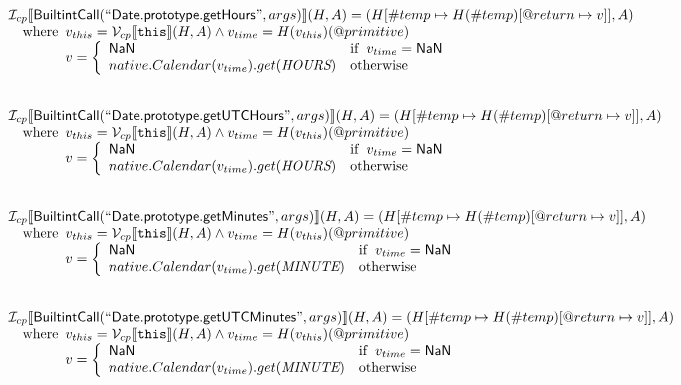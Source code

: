 \[\begin{array}{l}
\mathcal{I} _{cp}\llbracket \mbox{\textsf{BuiltintCall}}(``\mbox{\textsf{Date.prototype.getHours}}",args)\rrbracket(H,A)
  = (H[\#temp \mapsto H(\#temp)[@return \mapsto v]], A)\\
\quad{\rm where}\begin{array}[t]{l}
  v_{this} = \mathcal{V} _{cp}\llbracket \mbox{\texttt{this}}\rrbracket (H,A) \land v_{time} = H(v_{this})(@primitive)\\
  v = \left\{\begin{array}{ll}
    \mbox{\textsf{NaN}}  & {\rm if}\begin{array}[t]{l}v_{time} = \mbox{\textsf{NaN}}\end{array}\\
    native.Calendar(v_{time}).get(\emph{HOURS}) & {\rm otherwise}
    \end{array}\right.
  \end{array}\\
\\\\

\mathcal{I} _{cp}\llbracket \mbox{\textsf{BuiltintCall}}(``\mbox{\textsf{Date.prototype.getUTCHours}}",args)\rrbracket(H,A)
  = (H[\#temp \mapsto H(\#temp)[@return \mapsto v]], A)\\
\quad{\rm where}\begin{array}[t]{l}
  v_{this} = \mathcal{V} _{cp}\llbracket \mbox{\texttt{this}}\rrbracket (H,A) \land v_{time} = H(v_{this})(@primitive)\\
  v = \left\{\begin{array}{ll}
    \mbox{\textsf{NaN}}  & {\rm if}\begin{array}[t]{l}v_{time} = \mbox{\textsf{NaN}}\end{array}\\
    native.Calendar(v_{time}).get(\emph{HOURS}) & {\rm otherwise}
    \end{array}\right.
  \end{array}\\
\\\\

\mathcal{I} _{cp}\llbracket \mbox{\textsf{BuiltintCall}}(``\mbox{\textsf{Date.prototype.getMinutes}}",args)\rrbracket(H,A)
  = (H[\#temp \mapsto H(\#temp)[@return \mapsto v]], A)\\
\quad{\rm where}\begin{array}[t]{l}
  v_{this} = \mathcal{V} _{cp}\llbracket \mbox{\texttt{this}}\rrbracket (H,A) \land v_{time} = H(v_{this})(@primitive)\\
  v = \left\{\begin{array}{ll}
    \mbox{\textsf{NaN}}  & {\rm if}\begin{array}[t]{l}v_{time} = \mbox{\textsf{NaN}}\end{array}\\
    native.Calendar(v_{time}).get(\emph{MINUTE}) & {\rm otherwise}
    \end{array}\right.
  \end{array}\\
\\\\

\mathcal{I} _{cp}\llbracket \mbox{\textsf{BuiltintCall}}(``\mbox{\textsf{Date.prototype.getUTCMinutes}}",args)\rrbracket(H,A)
  = (H[\#temp \mapsto H(\#temp)[@return \mapsto v]], A)\\
\quad{\rm where}\begin{array}[t]{l}
  v_{this} = \mathcal{V} _{cp}\llbracket \mbox{\texttt{this}}\rrbracket (H,A) \land v_{time} = H(v_{this})(@primitive)\\
  v = \left\{\begin{array}{ll}
    \mbox{\textsf{NaN}}  & {\rm if}\begin{array}[t]{l}v_{time} = \mbox{\textsf{NaN}}\end{array}\\
    native.Calendar(v_{time}).get(\emph{MINUTE}) & {\rm otherwise}
    \end{array}\right.
  \end{array}\\
\\\\

\end{array}
\]


